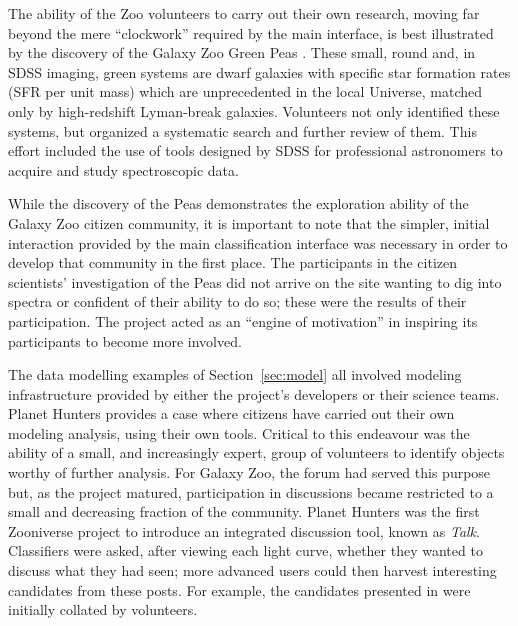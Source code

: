 \documentclass{ar2e}
\def\Sref#1{Section~\ref{#1}\xspace}
\def\CaseStudy#1{\noindent{\it\bf #1 \,\,\,\,}}
\def\Talk{{\it Talk}}
\begin{document}
The ability of the Zoo volunteers to carry out their own research, moving far
beyond the mere ``clockwork'' required by the main interface, is best
illustrated by the discovery of the Galaxy Zoo Green Peas
\citep{Cardamone++2009}. These small, round and, in SDSS imaging, green systems
are dwarf galaxies with specific star formation rates (SFR per unit mass) which
are unprecedented in the local Universe, matched only by high-redshift
Lyman-break galaxies. Volunteers not only identified these systems, but
organized a systematic search and further review of them. This effort included
the use of tools designed by SDSS for professional astronomers to acquire and
study spectroscopic data. 

While the discovery of the Peas demonstrates the exploration ability of the
Galaxy Zoo citizen community, it is important to note that the simpler, initial
interaction provided by the main classification interface was necessary in order
to develop that community in the first place. The participants in the citizen
scientists' investigation of the Peas did not arrive on the site wanting to dig
into spectra or confident of their ability to do so; these were the results of
their participation. The project acted as an ``engine of motivation'' in
inspiring its participants to become more involved. 



\CaseStudy{Lightcurve analysis on Planet Hunters \Talk.}  

The data modelling examples of \Sref{sec:model} all involved modeling
infrastructure provided by either the project's developers or their science
teams. Planet Hunters provides a case where citizens have carried out their own
modeling analysis, using their own tools. Critical to this endeavour was the
ability of a small,  and increasingly expert, group of volunteers to identify
objects worthy of further analysis. For Galaxy Zoo, the forum had served this
purpose but, as the project matured, participation in discussions became
restricted to a small and decreasing fraction of the community. Planet Hunters
was the first Zooniverse project to introduce an integrated discussion tool,
known as \Talk. Classifiers were asked, after viewing each light curve,
whether they wanted to discuss what they had seen; more advanced users could
then harvest interesting candidates from these posts. For example, the
candidates presented in \citet{LintottPH} were initially collated by volunteers.
\end{document}
